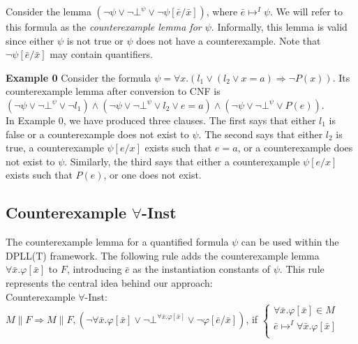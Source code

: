 \documentclass{llncs}
\begin{document}
Consider the lemma $( \neg \psi \vee \neg \bot^\psi \vee \neg \psi[\bar{e}/\bar{x}])$, where $\bar{e} \mapsto^I \psi$.
We will refer to this formula as the \emph{counterexample lemma for $\psi$}.
Informally, this lemma is valid since either $\psi$ is not true or $\psi$ does not have a counterexample.
Note that $\neg \psi[\bar{e}/\bar{x}]$ may contain quantifiers.

{\bf Example 0}
Consider the formula $\psi = \forall x. ( l_1 \vee ( l_2 \vee x = a ) \Rightarrow \neg P( x ) )$.
Its counterexample lemma after conversion to CNF is $( \neg \psi \vee \neg \bot^\psi \vee \neg l_1 ) \wedge ( \neg \psi \vee \neg \bot^\psi \vee l_2 \vee e = a ) \wedge ( \neg \psi \vee \neg \bot^\psi \vee P( e ) ) $. \\

In Example 0, we have produced three clauses.
The first says that either $l_1$ is false or a counterexample does not exist to $\psi$.
The second says that either $l_2$ is true, a counterexample $\psi[e/x]$ exists such that $e = a$, or a counterexample does not exist to $\psi$. 
Similarly, the third says that either a counterexample $\psi[e/x]$ exists such that $P( e )$, or one does not exist.

\subsection{Counterexample $\forall$-Inst}

The counterexample lemma for a quantified formula $\psi$ can be used within the DPLL(T) framework.
The following rule adds the counterexample lemma $\forall \bar{x}. \varphi[ \bar{ x } ]$ to $F$, introducing $\bar{e}$ as the instantiation constants of $\psi$.
This rule represents the central idea behind our approach: \\

\noindent Counterexample $\forall$-Inst: \\

$M \parallel F \Longrightarrow M \parallel F, (\neg \forall \bar{x}. \varphi[ \bar{x} ] \vee \neg \bot^{\forall \bar{x}. \varphi[ \bar{x} ]} \vee \neg \varphi[ \bar{ e }/\bar{x} ])$, if   
$\begin{cases}
  \forall \bar{x}. \varphi[ \bar{ x } ] \in M \\
  \bar{ e } \mapsto^I \forall \bar{x}. \varphi[ \bar{ x } ] \\
\end{cases}$ \\
\end{document}
